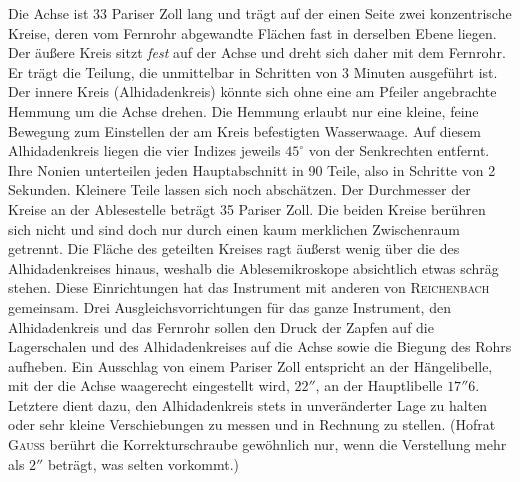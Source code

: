 Die Achse ist 33 Pariser Zoll lang und trägt auf der einen Seite zwei konzentrische Kreise, deren vom Fernrohr abgewandte Flächen fast in derselben Ebene liegen. Der äußere Kreis sitzt \textit{fest} auf der Achse und dreht sich daher mit dem Fernrohr. Er trägt die Teilung, die unmittelbar in Schritten von 3 
Minuten ausgeführt ist. Der innere Kreis (Alhidadenkreis) könnte sich ohne eine am Pfeiler angebrachte Hemmung um die Achse drehen. Die Hemmung erlaubt nur eine kleine, feine Bewegung zum Einstellen der am Kreis befestigten Wasserwaage. Auf diesem Alhidadenkreis liegen die vier Indizes jeweils $45^\circ$ von der Senkrechten entfernt. Ihre Nonien unterteilen jeden Hauptabschnitt in 90 Teile, also in Schritte von 2 Sekunden. Kleinere Teile lassen sich noch abschätzen. Der Durchmesser der Kreise an der Ablesestelle beträgt 35 Pariser Zoll. Die beiden Kreise berühren sich nicht und sind doch nur durch einen kaum merklichen Zwischenraum getrennt. Die Fläche des geteilten Kreises ragt äußerst wenig über die des Alhidadenkreises hinaus, weshalb die Ablesemikroskope absichtlich etwas schräg stehen. Diese Einrichtungen hat das Instrument mit anderen von \textsc{Reichenbach} gemeinsam. Drei Ausgleichsvorrichtungen für das ganze Instrument, den Alhidadenkreis und das Fernrohr sollen den Druck der Zapfen auf die Lagerschalen und des Alhidadenkreises auf die Achse sowie die Biegung des Rohrs aufheben. Ein Ausschlag von einem Pariser Zoll entspricht an der Hängelibelle, mit der die Achse waagerecht eingestellt wird, $22''$, an der Hauptlibelle $17''6$. Letztere dient dazu, den Alhidadenkreis stets in unveränderter Lage zu halten oder sehr kleine Verschiebungen zu messen und in Rechnung zu stellen. (Hofrat \textsc{Gauss} berührt die Korrekturschraube gewöhnlich nur, wenn die Verstellung mehr als $2''$ beträgt, was selten vorkommt.)

